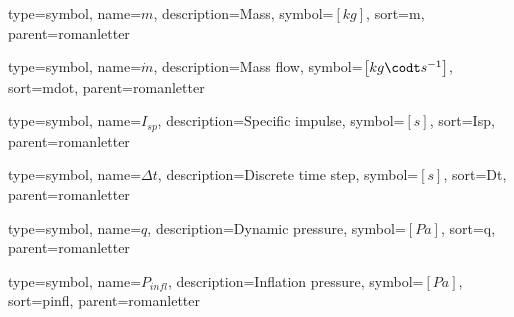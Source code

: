 {
type=symbol, %
name={\ensuremath{m}}, %
description={Mass}, %
symbol={$\left[kg\right]$}, %
sort=m, %
parent=romanletter %
}

{
type=symbol, %
name={\ensuremath{\dot{m}}}, %
description={Mass flow}, %
symbol={$\left[kg\codt s^{-1}\right]$}, %
sort=mdot, %
parent=romanletter %
}

{
type=symbol, %
name={\ensuremath{I_{sp}}}, %
description={Specific impulse}, %
symbol={$\left[s\right]$}, %
sort=Isp, %
parent=romanletter %
}

{
type=symbol, %
name={\ensuremath{\Delta t}}, %
description={Discrete time step}, %
symbol={$\left[s\right]$}, %
sort=Dt, %
parent=romanletter %
}

{
type=symbol, %
name={\ensuremath{q}}, %
description={Dynamic pressure}, %
symbol={$\left[Pa\right]$}, %
sort=q, %
parent=romanletter %
}

{
type=symbol, %
name={\ensuremath{P_{infl}}}, %
description={Inflation pressure}, %
symbol={$\left[Pa\right]$}, %
sort=pinfl, %
parent=romanletter %
}

